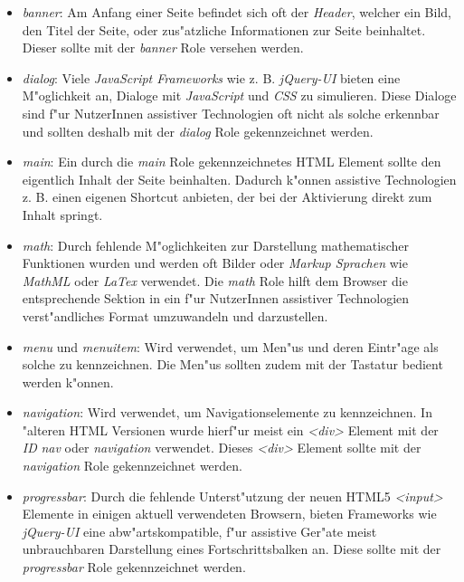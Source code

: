 \documentclass[a4paper,bibtotoc,oneside]{scrbook}
\begin{document}
\begin{itemize}
\item \emph{banner}: Am Anfang einer Seite befindet sich oft der \emph{Header}, welcher ein Bild, den Titel der Seite, oder zus"atzliche Informationen zur Seite beinhaltet. Dieser sollte mit der \emph{banner} Role versehen werden. \cite[Abschnitt 5.4, banner]{aria_roles}

\item \emph{dialog}: Viele \emph{JavaScript Frameworks} wie z. B. \emph{jQuery-UI} \cite{jquery_ui} bieten eine M"oglichkeit an, Dialoge mit \emph{JavaScript} und \emph{CSS} zu simulieren. Diese Dialoge sind f"ur NutzerInnen assistiver Technologien oft nicht als solche erkennbar und sollten deshalb mit der \emph{dialog} Role gekennzeichnet werden. \cite[Abschnitt 5.4, dialog]{aria_roles}

\item \emph{main}: Ein durch die \emph{main} Role gekennzeichnetes HTML Element sollte den eigentlich Inhalt der Seite beinhalten. Dadurch k"onnen assistive Technologien z. B. einen eigenen Shortcut anbieten, der bei der Aktivierung direkt zum Inhalt springt. \cite[Abschnitt 5.4, main]{aria_roles}

\item \emph{math}: Durch fehlende M"oglichkeiten zur Darstellung mathematischer Funktionen wurden und werden oft Bilder oder \emph{Markup Sprachen} wie \emph{MathML} oder \emph{LaTex} verwendet. Die \emph{math} Role hilft dem Browser die entsprechende Sektion in ein f"ur NutzerInnen assistiver Technologien verst"andliches Format umzuwandeln und darzustellen. \cite[Abschnitt 5.4, math]{aria_roles}

\item \emph{menu} und \emph{menuitem}: Wird verwendet, um Men"us und deren Eintr"age als solche zu kennzeichnen. Die Men"us sollten zudem mit der Tastatur bedient werden k"onnen. \cite[Abschnitt 5.4, menu, menuitem]{aria_roles}

\item \emph{navigation}: Wird verwendet, um Navigationselemente zu kennzeichnen. In "alteren HTML Versionen wurde hierf"ur meist ein \emph{<div>} Element mit der \emph{ID} \emph{nav} oder \emph{navigation} verwendet. Dieses \emph{<div>} Element sollte mit der \emph{navigation} Role gekennzeichnet werden. \cite[Abschnitt 5.4, navigation]{aria_roles}

\item \emph{progressbar}: Durch die fehlende Unterst"utzung der neuen HTML5 \emph{<input>} Elemente in einigen aktuell verwendeten Browsern, bieten Frameworks wie \emph{jQuery-UI}\cite{jquery_ui} eine abw"artskompatible, f"ur assistive Ger"ate meist unbrauchbaren Darstellung eines Fortschrittsbalken an. Diese sollte mit der \emph{progressbar} Role gekennzeichnet werden. \cite[Abschnitt 5.4, progressbar]{aria_roles}


\end{itemize}
\end{document}
